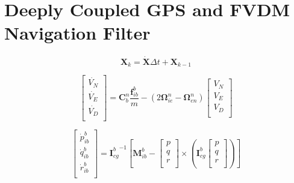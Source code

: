 \section{Deeply Coupled GPS and FVDM Navigation Filter}



\begin{equation}\label{eq:eulerIntegration}
    \mathbf{X}_{k} = \dot{\mathbf{X}}\Delta t + \mathbf{X}_{k-1}
\end{equation}

\begin{equation}\label{eq:acc}
    \begin{bmatrix}
        \dot{V_N} \\
        \dot{V_E} \\
        \dot{V_D} \\
    \end{bmatrix} =
    \mathbf{C}_{b}^{n}\frac{\mathbf{f}_{ib}^b}{m} - \left(2\mathbf{\Omega}_{ie}^n - \mathbf{\Omega}_{en}^n\right)
    \begin{bmatrix}
        V_N \\
        V_E \\
        V_D \\
    \end{bmatrix}
\end{equation}

\begin{equation}\label{eq:angacc}
    \begin{bmatrix}
        \dot{p}_{ib}^b \\
        \dot{q}_{ib}^b \\
        \dot{r}_{ib}^b \\
    \end{bmatrix} =
    {\mathbf{I}_{cg}^b}^{-1}\left[\mathbf{M}_{ib}^b -
        \begin{bmatrix}
            p \\
            q \\
            r \\
        \end{bmatrix} \times
        \left(\mathbf{I}_{cg}^b
        \begin{bmatrix}
            p \\
            q \\
            r \\
        \end{bmatrix}
        \right)
        \right]
\end{equation}

